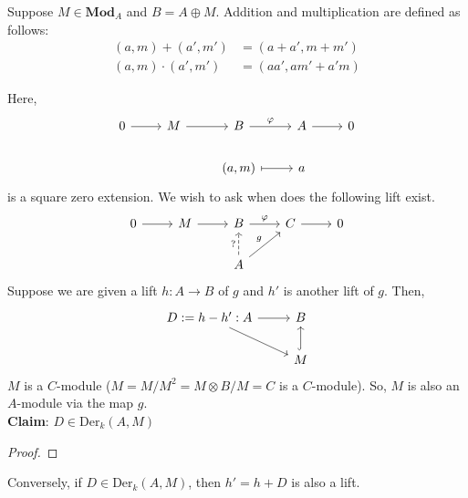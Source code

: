 \documentclass[oneside, 12pt, ]{scrbook}
\theoremstyle{theorem}
\begin{document}
\begin{example}
Suppose $M \in \mathbf{Mod}_{A}$ and $B = A \oplus M$. Addition and multiplication are defined as follows: 
\begin{align*}
(a,m) + (a',m') &= (a+a', m + m')\\
(a,m) \cdot (a',m') &= (aa' , am' + a'm)
\end{align*}

Here, 
\[\begin{tikzcd}
	0 & M & B & A & 0 \\
	&& {(a,m)} & a
	\arrow[from=1-1, to=1-2]
	\arrow[from=1-2, to=1-3]
	\arrow["\varphi", from=1-3, to=1-4]
	\arrow[from=1-4, to=1-5]
	\arrow[maps to, from=2-3, to=2-4]
\end{tikzcd}\]
is a square zero extension. We wish to ask when does the following lift exist. 
 \[\begin{tikzcd}
	0 & M & B & C & 0 \\
	&& A
	\arrow[from=1-1, to=1-2]
	\arrow[from=1-2, to=1-3]
	\arrow["\varphi", from=1-3, to=1-4]
	\arrow[from=1-4, to=1-5]
	\arrow["g", from=2-3, to=1-4]
	\arrow["{?}", dashed, from=2-3, to=1-3]
\end{tikzcd}\]
Suppose we are given a lift $h: A \rightarrow B$ of $g$ and $h'$ is another lift of $g$. Then, 
\[\begin{tikzcd}
	{D:= h-h' :A} & B \\
	& M
	\arrow[from=1-1, to=1-2]
	\arrow[from=1-1, to=2-2]
	\arrow[hook, from=2-2, to=1-2]
\end{tikzcd}\]
$M$ is a $C$-module ($M = M/M^2 = M \otimes B/M = C$ is a $C$-module). So, $M$ is also an $A$-module via the map $g$. \\

\textbf{Claim}: $D \in \mathrm{Der}_{k}(A,M)$ \\
\begin{proof}

\end{proof}
Conversely, if $D \in \mathrm{Der}_{k}(A,M)$, then $h' = h + D$ is also a lift. 
\end{example}
\end{document}
